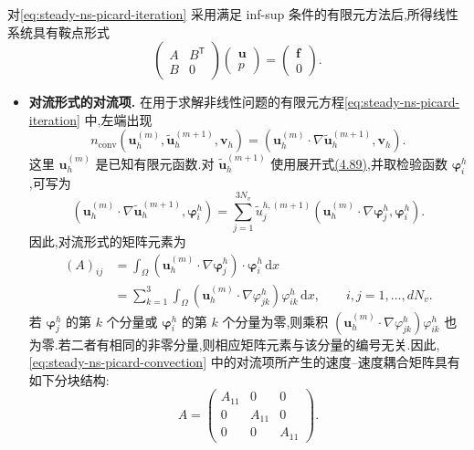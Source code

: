 \begin{note}\label{note:steady-ns-picard-matrix-structure}
对\cref{eq:steady-ns-picard-iteration} 采用满足 inf-sup 条件的有限元方法后,所得线性系统具有鞍点形式
\begin{equation}\label{eq:steady-ns-iteration-saddle-point}
  \begin{pmatrix}A&B^{\mathsf T}\\B&0\end{pmatrix}
  \begin{pmatrix}\bm{u}\\p\end{pmatrix}
  =
  \begin{pmatrix}\bm{f}\\0\end{pmatrix}.
\end{equation}
\begin{itemize}
  \item \textbf{对流形式的对流项.}
  在用于求解非线性问题的有限元方程\cref{eq:steady-ns-picard-iteration} 中,左端出现
  \begin{equation}\label{eq:steady-ns-picard-convection}
    n_{\mathrm{conv}}(\bm{u}_h^{(m)},
       \widetilde{\bm{u}}_h^{(m+1)},\bm{v}_h)
      =(\bm{u}_h^{(m)}\cdot\nabla
          \widetilde{\bm{u}}_h^{(m+1)},\bm{v}_h).
  \end{equation}
  这里 $\bm{u}_h^{(m)}$ 是已知有限元函数.对
  $\widetilde{\bm{u}}_h^{(m+1)}$ 使用展开式\hyperref[eq:stokes-algebraic-coefficients]{(4.89)},并取检验函数 $\symbf{\varphi}_i^h$,可写为
  \[
    (\bm{u}_h^{(m)}\cdot\nabla
       \widetilde{\bm{u}}_h^{(m+1)},\symbf{\varphi}_i^h)
      =\sum_{j=1}^{3N_v}
        \widetilde u_j^{h,(m+1)}
        (\bm{u}_h^{(m)}\cdot\nabla\symbf{\varphi}_j^h,
           \symbf{\varphi}_i^h).
  \]
  因此,对流形式的矩阵元素为
  \begin{equation}\label{eq:steady-ns-picard-convection-matrix-entry}
  \begin{aligned}
    (A)_{ij}
      &=\int_\Omega
          (\bm{u}_h^{(m)}\cdot\nabla\symbf{\varphi}_j^h)
             \cdot\symbf{\varphi}_i^h\,\mathrm{d}x\\
      &=\sum_{k=1}^{3}\int_\Omega
          (\bm{u}_h^{(m)}\cdot\nabla\varphi_{jk}^h)
             \varphi_{ik}^h\,\mathrm{d}x,
       \qquad i,j=1,\ldots,dN_v .
  \end{aligned}
  \end{equation}
  若 $\symbf{\varphi}_j^h$ 的第 $k$ 个分量或
  $\symbf{\varphi}_i^h$ 的第 $k$ 个分量为零,则乘积
  $(\bm{u}_h^{(m)}\cdot\nabla\varphi_{jk}^h)\varphi_{ik}^h$ 也为零.若二者有相同的非零分量,则相应矩阵元素与该分量的编号无关.因此,\cref{eq:steady-ns-picard-convection} 中的对流项所产生的速度--速度耦合矩阵具有如下分块结构:
  \begin{equation}\label{eq:steady-ns-picard-block-diagonal}
    A=
    \begin{pmatrix}
      A_{11}&0&0\\
      0&A_{11}&0\\
      0&0&A_{11}
    \end{pmatrix}.
  \end{equation}


\end{itemize}
\end{note}
